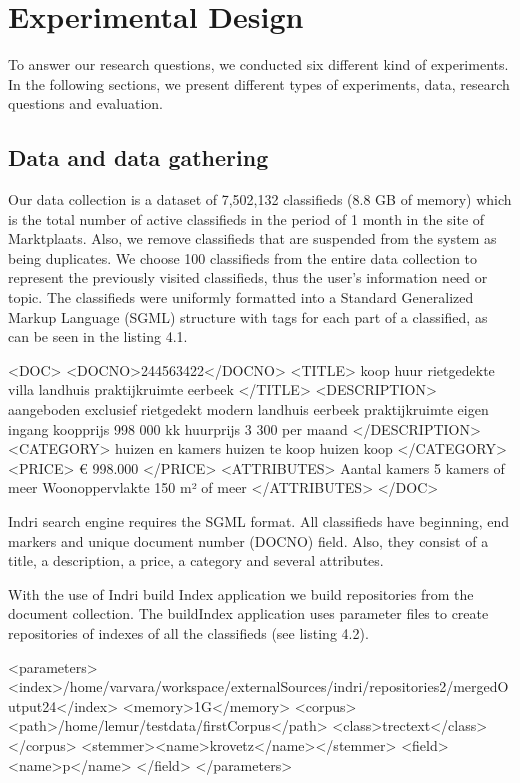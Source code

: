 \chapter{Experimental Design}
To answer our research questions, we conducted six different kind of experiments. In the following sections, we present different types of experiments, data, research questions and evaluation.



\section{Data and data gathering}

Our data collection is a dataset of 7,502,132 classifieds (8.8 GB of memory) which is the total number of active classifieds in the period of 1 month in the site of Marktplaats. Also, we remove classifieds that are suspended from the system as being duplicates. We choose 100 classifieds from the entire data collection to represent the previously visited classifieds, thus the user's information need or topic. The classifieds were uniformly formatted into a Standard Generalized Markup Language (SGML) structure with tags for each part of a classified, as can be seen in the listing 4.1.



{\small
\begin{code}[caption={SGML formated classified}]
<DOC>
	<DOCNO>244563422</DOCNO>
	 <TITLE>
		 koop huur rietgedekte villa landhuis praktijkruimte eerbeek
	</TITLE>
	<DESCRIPTION>
		 aangeboden exclusief rietgedekt modern landhuis eerbeek praktijkruimte eigen ingang koopprijs   998 000   kk   huurprijs   3 300   per maand
	</DESCRIPTION>
	<CATEGORY>
		 huizen en kamers huizen te koop  huizen koop
	</CATEGORY>
	<PRICE>
		€ 998.000
	</PRICE>
	<ATTRIBUTES>
	  Aantal kamers 5 kamers of meer Woonoppervlakte 150 m² of meer
	</ATTRIBUTES>
</DOC>
\end{code}
}

Indri search engine requires the SGML format. All classifieds have beginning, end markers and unique document number (DOCNO) field. Also, they consist of a title, a description, a price, a category and several attributes. 

With the use of Indri build Index application we build repositories from the document collection. The buildIndex application uses parameter files to create repositories of indexes of all the classifieds (see listing 4.2).

\begin{code}[caption={Build index parameter file}]
 <parameters>
	<index>/home/varvara/workspace/externalSources/indri/repositories2/mergedOutput24</index>
    <memory>1G</memory>
    <corpus>
      <path>/home/lemur/testdata/firstCorpus</path>
      <class>trectext</class>
    </corpus>
    <stemmer><name>krovetz</name></stemmer>
    <field>
      <name>p</name>
    </field>
  </parameters>
\end{code}


